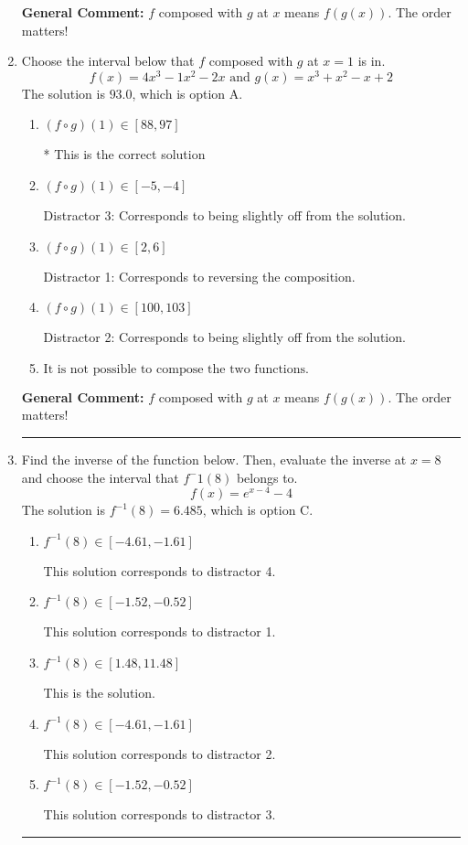 \documentclass{extbook}[14pt]
\newcommand{\litem}[1]{\item #1

\rule{\textwidth}{0.4pt}}
\begin{document}
\begin{enumerate}
{\begin{enumerate}[label=\Alph*.]
\end{enumerate}

\textbf{General Comment:} $f$ composed with $g$ at $x$ means $f(g(x))$. The order matters!
}
\litem{
Choose the interval below that $f$ composed with $g$ at $x=1$ is in.
\[ f(x) = 4x^{3} -1 x^{2} -2 x \text{ and } g(x) = x^{3} + x^{2} -x + 2 \]The solution is \( 93.0 \), which is option A.\begin{enumerate}[label=\Alph*.]
\item \( (f \circ g)(1) \in [88, 97] \)

* This is the correct solution
\item \( (f \circ g)(1) \in [-5, -4] \)

 Distractor 3: Corresponds to being slightly off from the solution.
\item \( (f \circ g)(1) \in [2, 6] \)

 Distractor 1: Corresponds to reversing the composition.
\item \( (f \circ g)(1) \in [100, 103] \)

 Distractor 2: Corresponds to being slightly off from the solution.
\item \( \text{It is not possible to compose the two functions.} \)


\end{enumerate}

\textbf{General Comment:} $f$ composed with $g$ at $x$ means $f(g(x))$. The order matters!
}
\litem{
Find the inverse of the function below. Then, evaluate the inverse at $x = 8$ and choose the interval that $f^-1(8)$ belongs to.
\[ f(x) = e^{x-4}-4 \]The solution is \( f^{-1}(8) = 6.485 \), which is option C.\begin{enumerate}[label=\Alph*.]
\item \( f^{-1}(8) \in [-4.61, -1.61] \)

 This solution corresponds to distractor 4.
\item \( f^{-1}(8) \in [-1.52, -0.52] \)

 This solution corresponds to distractor 1.
\item \( f^{-1}(8) \in [1.48, 11.48] \)

 This is the solution.
\item \( f^{-1}(8) \in [-4.61, -1.61] \)

 This solution corresponds to distractor 2.
\item \( f^{-1}(8) \in [-1.52, -0.52] \)

 This solution corresponds to distractor 3.
\end{enumerate}

}
\end{enumerate}
\end{document}
